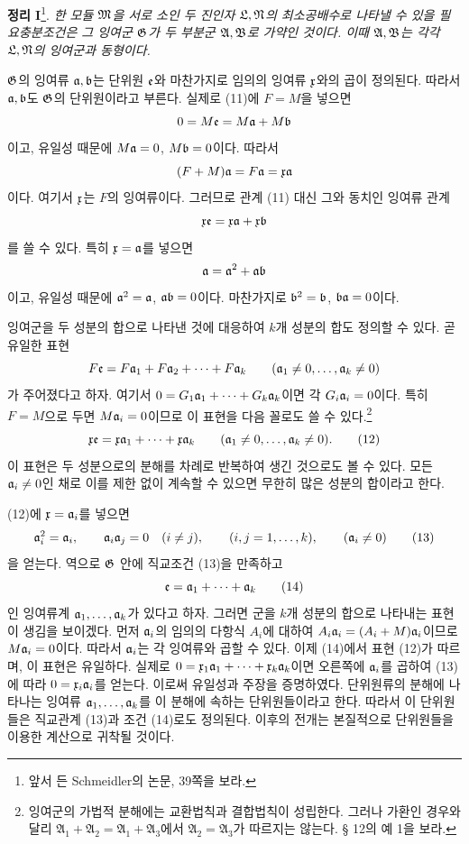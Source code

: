 \textbf{정리 I}\footnote{앞서 든 Schmeidler의 논문, 39쪽을 보라.}. \emph{한 모듈 \(\mathfrak M\)을 서로 소인 두 진인자 \(\mathfrak L,\mathfrak N\)의 최소공배수로 나타낼 수 있을 필요충분조건은 그 잉여군 \(\mathfrak G\)가 두 부분군 \(\mathfrak A,\mathfrak B\)로 가약인 것이다. 이때 \(\mathfrak A,\mathfrak B\)는 각각 \(\mathfrak L,\mathfrak N\)의 잉여군과 동형이다.}


\(\mathfrak G\)의 잉여류 \(\mathfrak{a},\mathfrak{b}\)는 단위원 \(\mathfrak e\)와 마찬가지로 임의의 잉여류 \(\mathfrak x\)와의 곱이 정의된다. 따라서 \(\mathfrak{a},\mathfrak{b}\)도 \(\mathfrak G\)의 단위원이라고 부른다. 실제로 (11)에 \(F=M\)을 넣으면
\[
 0=M\mathfrak e=M\mathfrak{a}+M\mathfrak{b}
\]
이고, 유일성 때문에 \(M\mathfrak{a}=0\), \(M\mathfrak{b}=0\)이다. 따라서
\[
 (F+M)\mathfrak{a}=F\mathfrak{a}=\mathfrak x\mathfrak{a}
\]
이다. 여기서 \(\mathfrak x\)는 \(F\)의 잉여류이다. 그러므로 관계 (11) 대신 그와 동치인 잉여류 관계
\[
 \mathfrak x\mathfrak e=\mathfrak x\mathfrak{a}+\mathfrak x\mathfrak{b}
\]
를 쓸 수 있다. 특히 \(\mathfrak x=\mathfrak{a}\)를 넣으면
\[
 \mathfrak{a}=\mathfrak{a}^2+\mathfrak{a}\mathfrak{b}
\]
이고, 유일성 때문에 \(\mathfrak{a}^2=\mathfrak{a}\), \(\mathfrak{a}\mathfrak{b}=0\)이다. 마찬가지로 \(\mathfrak{b}^2=\mathfrak{b}\), \(\mathfrak{b}\mathfrak{a}=0\)이다.

잉여군을 두 성분의 합으로 나타낸 것에 대응하여 \(k\)개 성분의 합도 정의할 수 있다. 곧 유일한 표현
\[
 F\mathfrak e=F\mathfrak{a}_1+F\mathfrak{a}_2+\cdots+F\mathfrak{a}_k
 \qquad(\mathfrak{a}_1\ne0,\ldots,\mathfrak{a}_k\ne0)
\]
가 주어졌다고 하자. 여기서 \(0=G_1\mathfrak{a}_1+\cdots+G_k\mathfrak{a}_k\)이면 각 \(G_i\mathfrak{a}_i=0\)이다. 특히 \(F=M\)으로 두면 \(M\mathfrak{a}_i=0\)이므로 이 표현을 다음 꼴로도 쓸 수 있다.\footnote{잉여군의 가법적 분해에는 교환법칙과 결합법칙이 성립한다. 그러나 가환인 경우와 달리 \(\mathfrak A_1+\mathfrak A_2=\mathfrak A_1+\mathfrak A_3\)에서 \(\mathfrak A_2=\mathfrak A_3\)가 따르지는 않는다. § 12의 예 1을 보라.}
\begin{equation}
 \mathfrak x\mathfrak e=\mathfrak x\mathfrak{a}_1+\cdots+\mathfrak x\mathfrak{a}_k
 \qquad(\mathfrak{a}_1\ne0,\ldots,\mathfrak{a}_k\ne0).
\tag{12}
\end{equation}
이 표현은 두 성분으로의 분해를 차례로 반복하여 생긴 것으로도 볼 수 있다. 모든 \(\mathfrak{a}_i\ne0\)인 채로 이를 제한 없이 계속할 수 있으면 무한히 많은 성분의 합이라고 한다.

(12)에 \(\mathfrak x=\mathfrak{a}_i\)를 넣으면
\begin{equation}
 \mathfrak{a}_i^2=\mathfrak{a}_i,\qquad
 \mathfrak{a}_i\mathfrak{a}_j=0\quad(i\ne j),\qquad
 (i,j=1,\ldots,k),\qquad
 (\mathfrak{a}_i\ne0)
\tag{13}
\end{equation}
을 얻는다. 역으로 \(\mathfrak G\) 안에 직교조건 (13)을 만족하고
\begin{equation}
 \mathfrak e=\mathfrak{a}_1+\cdots+\mathfrak{a}_k
\tag{14}
\end{equation}
인 잉여류계 \(\mathfrak{a}_1,\ldots,\mathfrak{a}_k\)가 있다고 하자. 그러면 군을 \(k\)개 성분의 합으로 나타내는 표현이 생김을 보이겠다. 먼저 \(\mathfrak{a}_i\)의 임의의 다항식 \(A_i\)에 대하여 \(A_i\mathfrak{a}_i=(A_i+M)\mathfrak{a}_i\)이므로 \(M\mathfrak{a}_i=0\)이다. 따라서 \(\mathfrak{a}_i\)는 각 잉여류와 곱할 수 있다. 이제 (14)에서 표현 (12)가 따르며, 이 표현은 유일하다. 실제로 \(0=\mathfrak x_1\mathfrak{a}_1+\cdots+\mathfrak x_k\mathfrak{a}_k\)이면 오른쪽에 \(\mathfrak{a}_i\)를 곱하여 (13)에 따라 \(0=\mathfrak x_i\mathfrak{a}_i\)를 얻는다. 이로써 유일성과 주장을 증명하였다. 단위원류의 분해에 나타나는 잉여류 \(\mathfrak{a}_1,\ldots,\mathfrak{a}_k\)를 이 분해에 속하는 단위원들이라고 한다. 따라서 이 단위원들은 직교관계 (13)과 조건 (14)로도 정의된다. 이후의 전개는 본질적으로 단위원들을 이용한 계산으로 귀착될 것이다.

